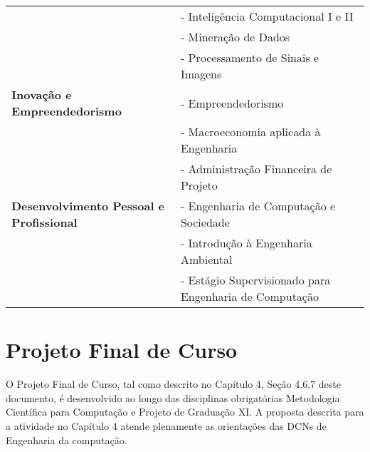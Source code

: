 \begin{table}[ht]
\begin{tabular}{l l}
                            & - Inteligência Computacional I e II                    \\

                            & - Mineração de Dados                                   \\

                            & - Processamento de Sinais e Imagens                    \\

    \hline

    \textbf{Inovação e Empreendedorismo }
                            & - Empreendedorismo                                     \\

                            & - Macroeconomia aplicada à Engenharia                  \\

                            & - Administração Financeira de Projeto                  \\

    \hline

    \textbf{Desenvolvimento Pessoal e Profissional}
                            & - Engenharia de Computação e Sociedade                 \\

                            & - Introdução à Engenharia Ambiental                    \\

                            & - Estágio Supervisionado para Engenharia de Computação \\

    \hline
  \end{tabular}
\end{table}


\section{Projeto Final de Curso}
O Projeto Final de Curso, tal como descrito no Capítulo 4, Seção 4.6.7 deste documento, é
desenvolvido ao longo das disciplinas obrigatórias Metodologia Científica para Computação e Projeto de Graduação XI. A proposta descrita para a atividade no Capítulo 4 atende plenamente as orientações das DCNs de Engenharia da computação.


